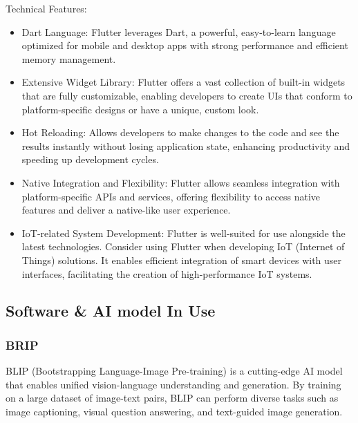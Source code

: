 \documentclass[conference]{IEEEtran}
\begin{document}
Technical Features:
\begin{itemize}
    \item Dart Language: Flutter leverages Dart, a powerful, easy-to-learn language optimized for mobile and desktop apps with strong performance and efficient memory management.\\
    \item Extensive Widget Library: Flutter offers a vast collection of built-in widgets that are fully customizable, enabling developers to create UIs that conform to platform-specific designs or have a unique, custom look.
    \item Hot Reloading: Allows developers to make changes to the code and see the results instantly without losing application state, enhancing productivity and speeding up development cycles.\\
    \item Native Integration and Flexibility: Flutter allows seamless integration with platform-specific APIs and services, offering flexibility to access native features and deliver a native-like user experience.\\
    \item IoT-related System Development: Flutter is well-suited for use alongside the latest technologies. Consider using Flutter when developing IoT (Internet of Things) solutions. It enables efficient integration of smart devices with user interfaces, facilitating the creation of high-performance IoT systems.
\end{itemize}


\subsection{Software \& AI model In Use}

\subsubsection{BRIP}

\noindent BLIP (Bootstrapping Language-Image Pre-training) is a cutting-edge AI model that enables unified vision-language understanding and generation. By training on a large dataset of image-text pairs, BLIP can perform diverse tasks such as image captioning, visual question answering, and text-guided image generation.\\
\end{document}
